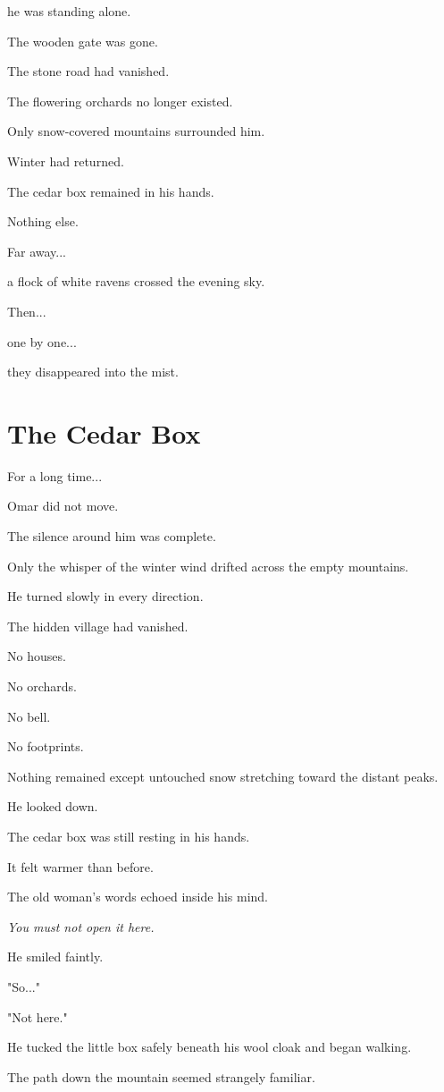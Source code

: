 \documentclass[12pt,openany]{book}
\begin{document}
he was standing alone.

The wooden gate was gone.

The stone road had vanished.

The flowering orchards no longer existed.

Only snow-covered mountains surrounded him.

Winter had returned.

The cedar box remained in his hands.

Nothing else.

Far away...

a flock of white ravens crossed the evening sky.

Then...

one by one...

they disappeared into the mist.
\section*{The Cedar Box}

For a long time...

Omar did not move.

The silence around him was complete.

Only the whisper of the winter wind drifted across the empty mountains.

He turned slowly in every direction.

The hidden village had vanished.

No houses.

No orchards.

No bell.

No footprints.

Nothing remained except untouched snow stretching toward the distant peaks.

He looked down.

The cedar box was still resting in his hands.

It felt warmer than before.

The old woman's words echoed inside his mind.

\emph{You must not open it here.}

He smiled faintly.

"So..."

"Not here."

He tucked the little box safely beneath his wool cloak and began walking.

The path down the mountain seemed strangely familiar.
\end{document}

